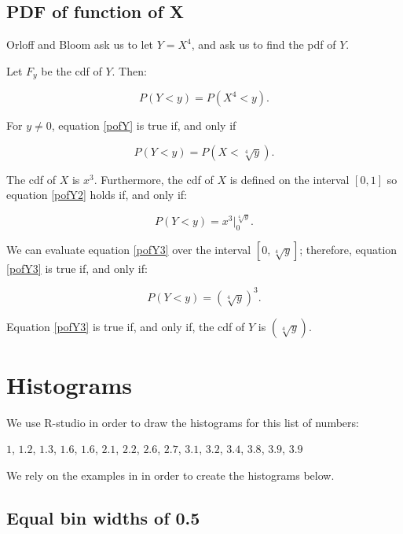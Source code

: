 \documentclass[a4paper,11pt]{article}
\begin{document}
\subsection{PDF of function of X}
Orloff and Bloom ask us to let $Y=X^4$, and ask us to find the pdf of $Y$.

Let $F_y$ be the cdf of $Y$. Then:

\begin{equation} \label{pofY}
  P\left(Y < y \right) = P \left( X^4 < y \right).
\end{equation}

For $y \neq 0$, equation \ref{pofY} is true if, and only if

\begin{equation} \label{pofY2}
  P\left(Y < y \right) = P \left( X < \sqrt[4]{y} \right).
\end{equation}

The cdf of $X$ is $x^3$. Furthermore, the cdf of $X$ is defined on
the interval $\left[0, 1 \right]$ so equation \ref{pofY2} holds if,
and only if:

\begin{equation}\label{pofY3}
  P\left(Y < y \right) = x^3 \bigg\rvert_0^{\sqrt[4]{y}}.
\end{equation}

We can evaluate equation \ref{pofY3} over the interval
$\left[ 0, \sqrt[4]{y} \right]$; therefore, equation \ref{pofY3} is
true if, and only if:


\begin{equation}\label{pofY3}
  P\left(Y < y \right) = \left( \sqrt[4]{y}\right)^3 .
\end{equation}

Equation \ref{pofY3} is true if, and only if, the cdf of $Y$ is
$\left( \sqrt[4]{y} \right)$.

\section{Histograms}
We use R-studio in order to draw the histograms for this list of numbers:

$1$, $1.2$, $1.3$, $1.6$, $1.6$, $2.1$, $2.2$, $2.6$, $2.7$, $3.1$, $3.2$,
$3.4$, $3.8$, $3.9$, $3.9$

We rely on the examples in \cite{studio3r} in order to create the histograms
below.
\subsection{Equal bin widths of 0.5}
\end{document}
